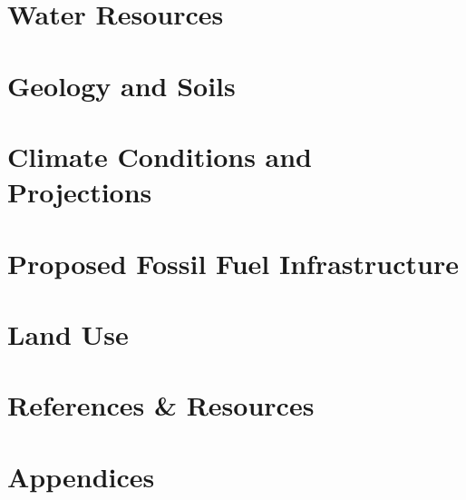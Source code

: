 \documentclass[11pt]{article}
\begin{document}
\section{Water Resources}\label{sec:water}


\section{Geology and Soils}\label{sec:geology}


\section{Climate Conditions and Projections}\label{sec:climate}


\section{Proposed Fossil Fuel Infrastructure}\label{sec:fossil}


\section{Land Use}\label{sec:landuse}



\section{References \& Resources}\label{sec:references}
\printbibliography

\appendix
\section*{Appendices}\label{sec:appendices}
\renewcommand{\thesubsection}{\Alph{subsection}}
\end{document}
